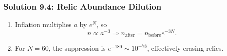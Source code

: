 \subsubsection*{Solution 9.4: Relic Abundance Dilution}

\begin{enumerate}[label=(\alph*)]
  \item Inflation multiplies $a$ by $e^N$, so
  \[
    n \propto a^{-3} \Rightarrow n_{\mathrm{after}} = n_{\mathrm{before}} e^{-3N}.
  \]

  \item For $N=60$, the suppression is $e^{-180} \sim 10^{-78}$, effectively erasing relics.
\end{enumerate}
